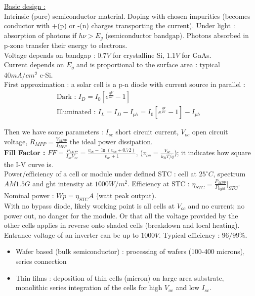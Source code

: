 \documentclass[../main.tex]{subfiles}
\begin{document}
 \quad \underline{Basic design :}\\
 Intrinsic (pure) semiconductor material. Doping with chosen impurities (becomes conductor with +(p) or -(n) charges transporting the current). Under light : absorption of photons if $h\nu > E_g$ (semiconductor bandgap). Photons absorbed in p-zone transfer their energy to electrons. \\

 Voltage depends on bandgap : $0.7V$ for crystalline Si, $1.1V$ for GaAs.\\
 Current depends on $E_g$ and is proportional to the surface area : typical $40 mA/cm^2$ c-Si.\\

 First approximation : a solar cell is a p-n diode with current source in parallel : \begin{equation}
     \begin{gathered}
         \text{Dark : } I_D = I_0 [e^{\frac{qV}{kT}}-1]\\
         \text{Illuminated : } I_L = I_D - I_{ph} = I_0 [e^{\frac{qV}{kT}}-1]-I_{ph}
     \end{gathered}
 \end{equation}

Then we have some parameters : $I_{sc}$ short circuit current, $V_{oc}$ open circuit voltage, $R_{MPP} = \frac{V_{MPP}}{I_{MPP}}$ the ideal power dissipation.\\
\textbf{Fill Factor :} $FF = \frac{P_{MPP}}{I_{sc} V_{oc}} = \frac{v_{oc}-\ln(v_{oc} + 0.72)}{v_{oc}+1}$, ($v_{oc} = \frac{V_{oc}}{k_BT/q}$); it indicates how square the I-V curve is. \\

Power/efficiency of a cell or module under defined STC : cell at $25^\circ C$, spectrum $AM1.5G$ and ght intensity at $1000W/m^2$. Efficiency at STC : $\eta_{STC} = \frac{P_{MPP}}{P_{light}}\rvert_{STC}$. Nominal power : $Wp = \eta_{STC} A$ (watt peak output).\\

With no bypass diode, likely working point is all cells at $V_{oc}$ and no current; no power out, no danger for the module. Or that all the voltage provided by the other cells applies in reverse onto shaded cells (breakdown and local heating).\\

Entrance voltage of an inverter can be up to $1000V$. Typical efficiency : $96/99\%$.\\

\begin{itemize}
    \item Wafer based (bulk semiconductor) : processing of wafers (100-400 microns), series connection
    \item Thin films : deposition of thin cells (micron) on large area substrate, monolithic series integration of the cells for high $V_{oc}$ and low $I_{sc}$.
\end{itemize}
\end{document}
